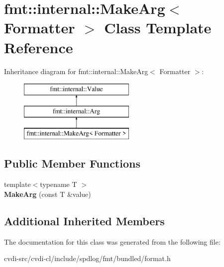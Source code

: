 \hypertarget{classfmt_1_1internal_1_1MakeArg}{}\section{fmt\+:\+:internal\+:\+:Make\+Arg$<$ Formatter $>$ Class Template Reference}
\label{classfmt_1_1internal_1_1MakeArg}
Inheritance diagram for fmt\+:\+:internal\+:\+:Make\+Arg$<$ Formatter $>$\+:\begin{figure}[H]
\begin{center}
\leavevmode
\includegraphics[height=3.000000cm]{classfmt_1_1internal_1_1MakeArg}
\end{center}
\end{figure}
\subsection*{Public Member Functions}
\begin{DoxyCompactItemize}
\item 
{\footnotesize template$<$typename T $>$ }\\{\bfseries Make\+Arg} (const T \&value)\hypertarget{classfmt_1_1internal_1_1MakeArg_a53625ddfa5c07dd9cfa516a5a70cc30f}{}\label{classfmt_1_1internal_1_1MakeArg_a53625ddfa5c07dd9cfa516a5a70cc30f}

\end{DoxyCompactItemize}
\subsection*{Additional Inherited Members}


The documentation for this class was generated from the following file\+:\begin{DoxyCompactItemize}
\item 
cvdi-\/src/cvdi-\/cl/include/spdlog/fmt/bundled/format.\+h\end{DoxyCompactItemize}
